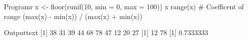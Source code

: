 
\begin{code}
    {Program}{r}
x <- floor(runif(10, min = 0, max = 100))
x
range(x)
# Coefficent of range
(max(x) - min(x)) / (max(x) + min(x))
\end{code}
\begin{code}
    {Output}{text}
 [1] 38 31 39 44 68 78 47 12 20 27
[1] 12 78
[1] 0.7333333
\end{code}
